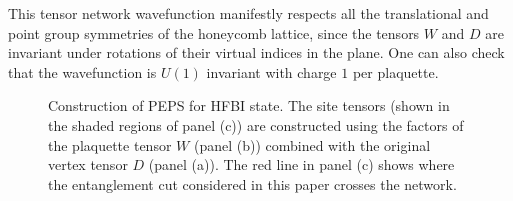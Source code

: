 This tensor network wavefunction manifestly respects all the
translational and point group symmetries of the honeycomb lattice,
since the tensors $W$ and $D$ are invariant under rotations of their
virtual indices in the plane. One can also check that the
wavefunction is $U(1)$ invariant with charge $1$ per plaquette.

\begin{figure}
	\centering
	\quad
\label{fig:PEPSforFBI}
\caption{Construction of PEPS for HFBI state. 
The site tensors (shown in the shaded regions of panel (c)) are constructed
using the factors of the plaquette tensor $W$ (panel (b))
combined with the original vertex tensor $D$ (panel (a)).
The red line in panel (c) shows where the entanglement cut considered in this paper
crosses the network. 
}
\end{figure}

